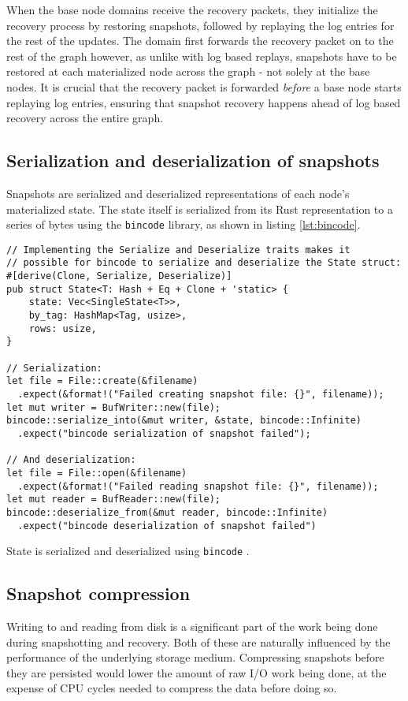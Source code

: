 \documentclass[b5paper]{report}
\begin{document}
When the base node domains receive the recovery packets, they initialize the
recovery process by restoring snapshots, followed by replaying the log entries
for the rest of the updates. The domain first forwards the recovery packet on to
the rest of the graph however, as unlike with log based replays, snapshots have
to be restored at each materialized node across the graph - not solely at the base
nodes. It is crucial that the recovery packet is forwarded \textit{before} a
base node starts replaying log entries, ensuring that snapshot recovery happens
ahead of log based recovery across the entire graph.

\subsection{Serialization and deserialization of snapshots} \label{sec:bincode}
Snapshots are serialized and deserialized representations of each node's
materialized state. The state itself is serialized from its Rust representation
to a series of bytes using the \texttt{bincode} \cite{bincode} library, as shown
in listing \ref{lst:bincode}.

\begin{listing}[H]
  \begin{verbatim}
// Implementing the Serialize and Deserialize traits makes it
// possible for bincode to serialize and deserialize the State struct:
#[derive(Clone, Serialize, Deserialize)]
pub struct State<T: Hash + Eq + Clone + 'static> {
    state: Vec<SingleState<T>>,
    by_tag: HashMap<Tag, usize>,
    rows: usize,
}

// Serialization:
let file = File::create(&filename)
  .expect(&format!("Failed creating snapshot file: {}", filename));
let mut writer = BufWriter::new(file);
bincode::serialize_into(&mut writer, &state, bincode::Infinite)
  .expect("bincode serialization of snapshot failed");

// And deserialization:
let file = File::open(&filename)
  .expect(&format!("Failed reading snapshot file: {}", filename));
let mut reader = BufReader::new(file);
bincode::deserialize_from(&mut reader, bincode::Infinite)
  .expect("bincode deserialization of snapshot failed")
  \end{verbatim}
  \caption{
    State is serialized and deserialized using \texttt{bincode} \cite{bincode}.
    \label{lst:bincode}
  }
\end{listing}

\subsection{Snapshot compression} \label{sec:compression}
Writing to and reading from disk is a significant part of the work being done
during snapshotting and recovery. Both of these are naturally influenced by the
performance of the underlying storage medium. Compressing snapshots before they
are persisted would lower the amount of raw I/O work being done, at the expense
of CPU cycles needed to compress the data before doing so.
\end{document}
